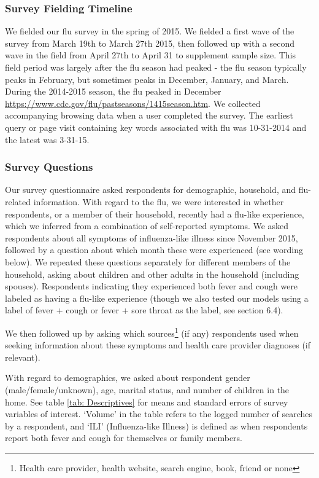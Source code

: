 \documentclass[12pt]{article}
\begin{document}
\subsubsection{Survey Fielding Timeline}
We fielded our flu survey in the spring of 2015. We fielded a first wave of the survey from March 19th to March 27th 2015, then followed up with a second wave in the field from April 27th to April 31 to supplement sample size. This field period was largely after the flu season had peaked - the flu season typically peaks in February, but sometimes peaks in December, January, and March. During the 2014-2015 season, the flu peaked in December \url{https://www.cdc.gov/flu/pastseasons/1415season.htm}. We collected accompanying browsing data when a user completed the survey. The earliest query or page visit containing key words associated with flu was 10-31-2014 and the latest was 3-31-15. 

\subsubsection{Survey Questions}

Our survey questionnaire asked respondents for demographic, household, and flu-related information. With regard to the flu, we were interested in whether respondents, or a member of their household, recently had a flu-like experience, which we inferred from a combination of self-reported symptoms. We asked respondents about all symptoms of influenza-like illness since November 2015, followed by a question about which month these were experienced (see wording below). We repeated these questions separately for different members of the household, asking about children and other adults in the household (including spouses). Respondents indicating they experienced both fever and cough were labeled as having a flu-like experience (though we also tested our models using a label of fever + cough or fever + sore throat as the label, see section 6.4). 

We then followed up by asking which sources\footnote{Health care provider, health website, search engine, book, friend or none} (if any) respondents used when seeking information about these symptoms and health care provider diagnoses (if relevant). %

With regard to demographics, we asked about respondent gender (male/female/unknown), age, marital status, and number of children in the home. See table \ref{tab: Descriptives} for means and standard errors of survey variables of interest. `Volume' in the table refers to the logged number of searches by a respondent, and `ILI' (Influenza-like Illness) is defined as when respondents report both fever and cough for themselves or family members.
\end{document}
